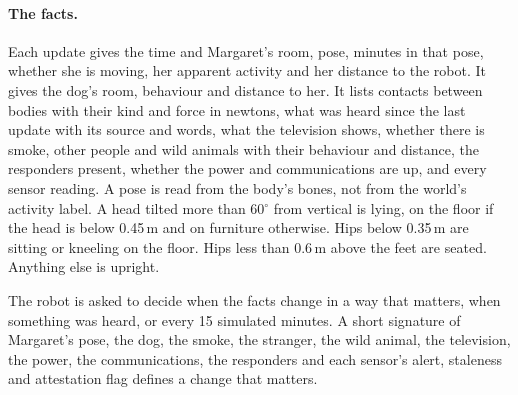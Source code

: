 \paragraph{The facts.} Each update gives the time and Margaret's room, pose, minutes in that pose,
whether she is moving, her apparent activity and her distance to the robot. It gives the dog's room,
behaviour and distance to her. It lists contacts between bodies with their kind and force in
newtons, what was heard since the last update with its source and words, what the television shows,
whether there is smoke, other people and wild animals with their behaviour and distance, the
responders present, whether the power and communications are up, and every sensor reading. A pose is
read from the body's bones, not from the world's activity label. A head tilted more than
60$^\circ$ from vertical is lying, on the floor if the head is below 0.45\,m and on furniture
otherwise. Hips below 0.35\,m are sitting or kneeling on the floor. Hips less than 0.6\,m above the
feet are seated. Anything else is upright.

The robot is asked to decide when the facts change in a way that matters, when something was heard,
or every 15 simulated minutes. A short signature of Margaret's pose, the dog, the smoke, the
stranger, the wild animal, the television, the power, the communications, the responders and each
sensor's alert, staleness and attestation flag defines a change that matters.

